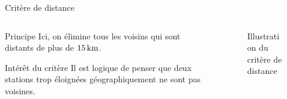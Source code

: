 \begin{frame}{Critère de distance}
    \begin{columns}
        \begin{column}{0.4\paperwidth}
            \begin{block}{Principe}
                Ici, on élimine tous les voisins qui sont distants de plus de $\unit[15]{km}$.
            \end{block}
            \begin{block}{Intérêt du critère}
                Il est logique de penser que deux stations trop éloignées géographiquement ne sont pas voisines.
            \end{block}
        \end{column}
        \begin{column}{0.55\paperwidth}
            \begin{figure}
                \caption{\label{fig:distance_crit}Illustration du critère de distance}
            \end{figure}
        \end{column}
    \end{columns}
\end{frame}

